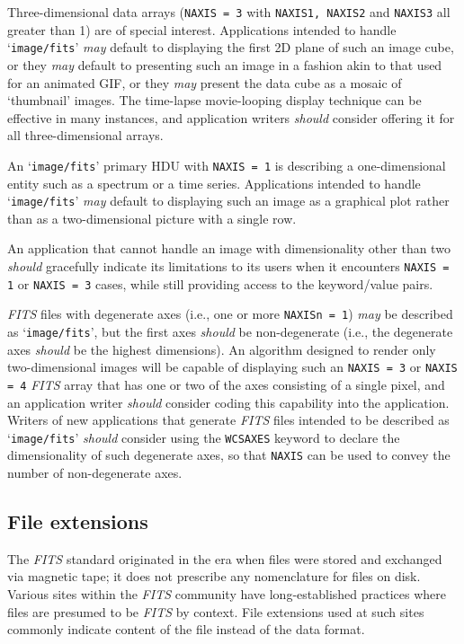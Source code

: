 \documentclass[onecolumn]{aa}
\begin{document}
  Three-dimensional data arrays ({\tt NAXIS = 3} with {\tt NAXIS1, NAXIS2}
and {\tt NAXIS3}
  all greater than 1) are of special interest.  Applications intended to handle
  `{\tt image/fits}' {\em may} default to displaying the first 2D plane of such an
  image cube, or they {\em may} default to presenting such an image in a
  fashion akin to that used for an animated GIF, or they {\em may} present
  the data cube as a mosaic of `thumbnail' images.  The time-lapse movie-looping
  display technique can be effective in many instances, and application writers 
  {\em should} consider offering it for all three-dimensional arrays.

  An `{\tt image/fits}' primary HDU with {\tt NAXIS = 1} is describing a one-dimensional
  entity such as a spectrum or a time series.  Applications intended to
  handle `{\tt image/fits}' {\em may} default to displaying such an image as a
  graphical plot rather than as a two-dimensional picture with a single
  row.

  An application that cannot handle an image with dimensionality other
  than two {\em should} gracefully indicate its limitations to its users when
  it encounters {\tt NAXIS = 1} or {\tt NAXIS = 3} cases, while still providing access
  to the keyword/value pairs.

  {\em FITS\/} files with degenerate axes (i.e., one or more {\tt NAXISn = 1}) {\em may} be
  described as `{\tt image/fits}', but the first axes {\em should} be 
  non-degenerate (i.e., the degenerate axes {\em should} be the highest
  dimensions).  An algorithm designed to render only two-dimensional
  images will be capable of displaying such an {\tt NAXIS = 3} or {\tt NAXIS = 4}
   {\em FITS\/}
  array that has one or two of the axes consisting of a single pixel,
  and an application writer {\em should} consider coding this capability into
  the application.  Writers of new applications that generate {\em FITS\/}
  files intended to be described as `{\tt image/fits}' {\em should} consider using
  the {\tt WCSAXES} keyword \citep{greisen06} to declare the dimensionality of such
  degenerate axes, so that {\tt NAXIS} can be used to convey the number of
  non-degenerate axes.

\subsection{File extensions}

  The {\em FITS\/} standard originated in the era when files were stored and
  exchanged via magnetic tape; it does not prescribe any nomenclature
  for files on disk.  Various sites within the {\em FITS\/} community have
  long-established practices where files are presumed to be {\em FITS\/} by
  context.  File extensions used at such sites commonly indicate
  content of the file instead of the data format.
\end{document}
